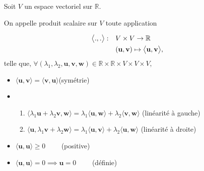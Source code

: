 \documentclass[letterpaper,11pt,english]{sphinxmanual}
\begin{document}
\begin{DUlineblock}{0em}
\item[]  Soit \(V\) un espace
vectoriel sur \(\mathbb{R}\).
\item[] On appelle produit scalaire sur \(V\) toute application
\end{DUlineblock}
\begin{equation}\label{equation:chapter2:chapter2:13}
\begin{split}\begin{aligned}
    \big{<}.,.\big{>}:\quad &V\times V\rightarrow{\mathbb{R}}\\
    &(\mathbf{u},\mathbf{v})\mapsto \big{<}\mathbf{u},\mathbf{v}\big{>}, \end{aligned}\end{split}
\end{equation}
\sphinxAtStartPar
telle que,
\(\forall ( \lambda_1, \lambda_2, \mathbf{u}, \mathbf{v}, \mathbf{w}) \in \mathbb{R}\times\mathbb{R}\times V\times V \times V,\)
\begin{itemize}
\item {} 
\sphinxAtStartPar
\(\langle\mathbf{u}, \mathbf{v}\rangle = \langle\mathbf{v}, \mathbf{u}\rangle\)(symétrie)

\item {} \begin{enumerate}
%
\item {} 
\sphinxAtStartPar
\(\langle\lambda_1 \mathbf{u}+\lambda_2 \mathbf{v}, \mathbf{w}\rangle = \lambda_1\langle \mathbf{u},\mathbf{w}\rangle +\lambda_2\langle \mathbf{v},\mathbf{w}\rangle\)
(linéarité à gauche)

\item {} 
\sphinxAtStartPar
\(\langle\mathbf{u}, \lambda_1 \mathbf{v}+\lambda_2 \mathbf{w}\rangle = \lambda_1\langle \mathbf{u},\mathbf{v}\rangle +\lambda_2\langle \mathbf{u},\mathbf{w}\rangle\)
(linéarité à droite)

\end{enumerate}

\item {} 
\sphinxAtStartPar
\(\langle\mathbf{u}, \mathbf{u}\rangle \geq 0 \qquad\) (positive)

\item {} 
\sphinxAtStartPar
\(\langle\mathbf{u}, \mathbf{u}\rangle = 0 \implies \mathbf{u}=0 \qquad\)
(définie)

\end{itemize}
\end{document}
